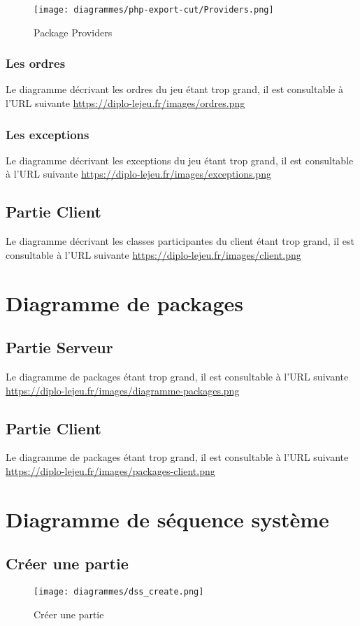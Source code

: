 			\begin{figure}[H]
				\centering
				\texttt{[image: diagrammes/php-export-cut/Providers.png]}
				\caption{\label{pproviders}Package Providers}
			\end{figure}

		\subsubsection{Les ordres}
		Le diagramme décrivant les ordres du jeu étant trop grand, il est consultable à l'URL suivante \url{https://diplo-lejeu.fr/images/ordres.png}

		\subsubsection{Les exceptions}
		Le diagramme décrivant les exceptions du jeu étant trop grand, il est consultable à l'URL suivante \url{https://diplo-lejeu.fr/images/exceptions.png}

	\pagebreak
	\subsection{Partie Client}
		Le diagramme décrivant les classes participantes du client étant trop grand, il est consultable à l'URL suivante \url{https://diplo-lejeu.fr/images/client.png}

\section{Diagramme de packages}
	\subsection{Partie Serveur}
		Le diagramme de packages étant trop grand, il est consultable à l'URL suivante \url{https://diplo-lejeu.fr/images/diagramme-packages.png}

	\subsection{Partie Client}
		Le diagramme de packages étant trop grand, il est consultable à l'URL suivante \url{https://diplo-lejeu.fr/images/packages-client.png}

\section{Diagramme de séquence système}
	\subsection{Créer une partie}
		\vspace{10mm}
		\begin{figure}[H]
			\centering
			\texttt{[image: diagrammes/dss\_create.png]}
			\caption{Créer une partie}
		\end{figure}

